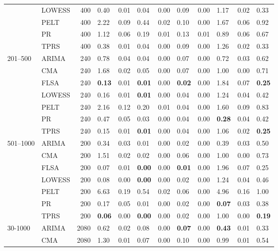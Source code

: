 \begin{table}[ht]
\begin{tabular}{llrlrlrlrlrl}
   & LOWESS & 400 & 0.40 & 0.01 & 0.04 & 0.00 & 0.09 & 0.00 & 1.17 & 0.02 & 0.33 \\ 
   & PELT & 400 & 2.22 & 0.09 & 0.44 & 0.02 & 0.10 & 0.00 & 1.67 & 0.06 & 0.92 \\ 
   & PR & 400 & 1.12 & 0.06 & 0.19 & 0.01 & 0.13 & 0.01 & 0.89 & 0.06 & 0.67 \\ 
   & TPRS & 400 & 0.38 & 0.01 & 0.04 & 0.00 & 0.09 & 0.00 & 1.26 & 0.02 & 0.33 \\ 
  201–500 & ARIMA & 240 & 0.78 & 0.04 & 0.04 & 0.00 & 0.07 & 0.00 & 0.72 & 0.03 & 0.62 \\ 
   & CMA & 240 & 1.68 & 0.02 & 0.05 & 0.00 & 0.07 & 0.00 & 1.00 & 0.00 & 0.71 \\ 
   & FLSA & 240 & \textbf{0.13} & 0.01 & \textbf{0.01} & 0.00 & \textbf{0.02} & 0.00 & 1.84 & 0.07 & \textbf{0.25} \\ 
   & LOWESS & 240 & 0.16 & 0.01 & \textbf{0.01} & 0.00 & 0.04 & 0.00 & 1.24 & 0.04 & 0.42 \\ 
   & PELT & 240 & 2.16 & 0.12 & 0.20 & 0.01 & 0.04 & 0.00 & 1.60 & 0.09 & 0.83 \\ 
   & PR & 240 & 0.47 & 0.05 & 0.03 & 0.00 & 0.04 & 0.00 & \textbf{0.28} & 0.04 & 0.42 \\ 
   & TPRS & 240 & 0.15 & 0.01 & \textbf{0.01} & 0.00 & 0.04 & 0.00 & 1.06 & 0.02 & \textbf{0.25} \\ 
  501–1000 & ARIMA & 200 & 0.34 & 0.03 & 0.01 & 0.00 & 0.02 & 0.00 & 0.39 & 0.03 & 0.50 \\ 
   & CMA & 200 & 1.51 & 0.02 & 0.02 & 0.00 & 0.06 & 0.00 & 1.00 & 0.00 & 0.73 \\ 
   & FLSA & 200 & 0.07 & 0.01 & \textbf{0.00} & 0.00 & \textbf{0.01} & 0.00 & 1.96 & 0.07 & 0.25 \\ 
   & LOWESS & 200 & 0.08 & 0.00 & \textbf{0.00} & 0.00 & 0.02 & 0.00 & 1.24 & 0.04 & 0.46 \\ 
   & PELT & 200 & 6.63 & 0.19 & 0.54 & 0.02 & 0.06 & 0.00 & 4.96 & 0.16 & 1.00 \\ 
   & PR & 200 & 0.17 & 0.05 & 0.01 & 0.00 & 0.02 & 0.00 & \textbf{0.07} & 0.03 & 0.38 \\ 
   & TPRS & 200 & \textbf{0.06} & 0.00 & \textbf{0.00} & 0.00 & 0.02 & 0.00 & 1.00 & 0.00 & \textbf{0.19} \\ 
  30-1000 & ARIMA & 2080 & 0.62 & 0.02 & 0.08 & 0.00 & \textbf{0.07} & 0.00 & \textbf{0.43} & 0.01 & 0.33 \\ 
   & CMA & 2080 & 1.30 & 0.01 & 0.07 & 0.00 & 0.10 & 0.00 & 0.99 & 0.01 & 0.54 \\ 

\end{tabular}
\end{table}

